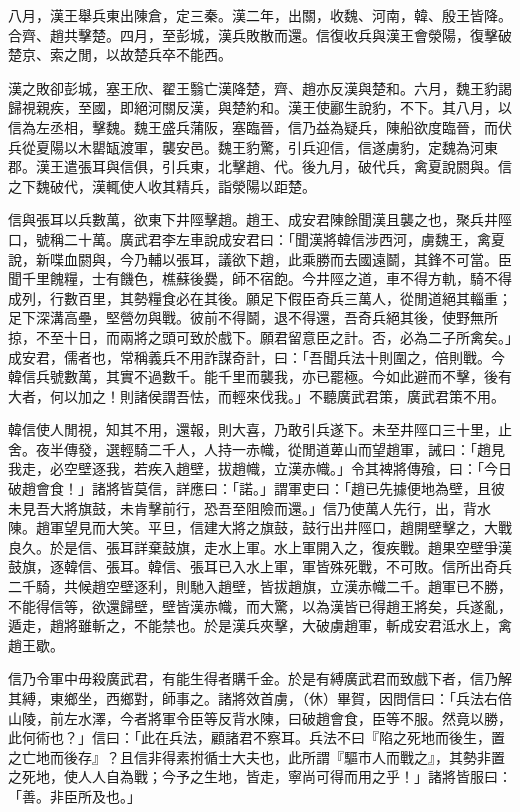 \begin{pinyinscope}
八月，漢王舉兵東出陳倉，定三秦。漢二年，出關，收魏、河南，韓、殷王皆降。合齊、趙共擊楚。四月，至彭城，漢兵敗散而還。信復收兵與漢王會滎陽，復擊破楚京、索之閒，以故楚兵卒不能西。

漢之敗卻彭城，塞王欣、翟王翳亡漢降楚，齊、趙亦反漢與楚和。六月，魏王豹謁歸視親疾，至國，即絕河關反漢，與楚約和。漢王使酈生說豹，不下。其八月，以信為左丞相，擊魏。魏王盛兵蒲阪，塞臨晉，信乃益為疑兵，陳船欲度臨晉，而伏兵從夏陽以木罌缻渡軍，襲安邑。魏王豹驚，引兵迎信，信遂虜豹，定魏為河東郡。漢王遣張耳與信俱，引兵東，北擊趙、代。後九月，破代兵，禽夏說閼與。信之下魏破代，漢輒使人收其精兵，詣滎陽以距楚。

信與張耳以兵數萬，欲東下井陘擊趙。趙王、成安君陳餘聞漢且襲之也，聚兵井陘口，號稱二十萬。廣武君李左車說成安君曰：「聞漢將韓信涉西河，虜魏王，禽夏說，新喋血閼與，今乃輔以張耳，議欲下趙，此乘勝而去國遠鬬，其鋒不可當。臣聞千里餽糧，士有饑色，樵蘇後爨，師不宿飽。今井陘之道，車不得方軌，騎不得成列，行數百里，其勢糧食必在其後。願足下假臣奇兵三萬人，從閒道絕其輜重；足下深溝高壘，堅營勿與戰。彼前不得鬬，退不得還，吾奇兵絕其後，使野無所掠，不至十日，而兩將之頭可致於戲下。願君留意臣之計。否，必為二子所禽矣。」成安君，儒者也，常稱義兵不用詐謀奇計，曰：「吾聞兵法十則圍之，倍則戰。今韓信兵號數萬，其實不過數千。能千里而襲我，亦已罷極。今如此避而不擊，後有大者，何以加之！則諸侯謂吾怯，而輕來伐我。」不聽廣武君策，廣武君策不用。

韓信使人閒視，知其不用，還報，則大喜，乃敢引兵遂下。未至井陘口三十里，止舍。夜半傳發，選輕騎二千人，人持一赤幟，從閒道萆山而望趙軍，誡曰：「趙見我走，必空壁逐我，若疾入趙壁，拔趙幟，立漢赤幟。」令其裨將傳飱，曰：「今日破趙會食！」諸將皆莫信，詳應曰：「諾。」謂軍吏曰：「趙已先據便地為壁，且彼未見吾大將旗鼓，未肯擊前行，恐吾至阻險而還。」信乃使萬人先行，出，背水陳。趙軍望見而大笑。平旦，信建大將之旗鼓，鼓行出井陘口，趙開壁擊之，大戰良久。於是信、張耳詳棄鼓旗，走水上軍。水上軍開入之，復疾戰。趙果空壁爭漢鼓旗，逐韓信、張耳。韓信、張耳已入水上軍，軍皆殊死戰，不可敗。信所出奇兵二千騎，共候趙空壁逐利，則馳入趙壁，皆拔趙旗，立漢赤幟二千。趙軍已不勝，不能得信等，欲還歸壁，壁皆漢赤幟，而大驚，以為漢皆已得趙王將矣，兵遂亂，遁走，趙將雖斬之，不能禁也。於是漢兵夾擊，大破虜趙軍，斬成安君泜水上，禽趙王歇。

信乃令軍中毋殺廣武君，有能生得者購千金。於是有縛廣武君而致戲下者，信乃解其縛，東鄉坐，西鄉對，師事之。諸將效首虜，（休）畢賀，因問信曰：「兵法右倍山陵，前左水澤，今者將軍令臣等反背水陳，曰破趙會食，臣等不服。然竟以勝，此何術也？」信曰：「此在兵法，顧諸君不察耳。兵法不曰『陷之死地而後生，置之亡地而後存』？且信非得素拊循士大夫也，此所謂『驅市人而戰之』，其勢非置之死地，使人人自為戰；今予之生地，皆走，寧尚可得而用之乎！」諸將皆服曰：「善。非臣所及也。」


\end{pinyinscope}
